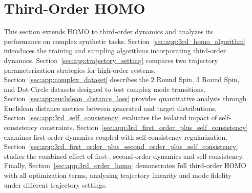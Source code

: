 \section{Third-Order HOMO}\label{sec:app:3rd_homo}
This section extends HOMO to third-order dynamics and analyzes its performance on complex synthetic tasks. Section~\ref{sec:app:3rd_homo_algorithm} introduces the training and sampling algorithms incorporating third-order dynamics. Section~\ref{sec:app:trajectory_setting} compares two trajectory parameterization strategies for high-order systems. Section~\ref{sec:app:complex_dataset} describes the 2 Round Spin, 3 Round Spin, and Dot-Circle datasets designed to test complex mode transitions. Section~\ref{sec:app:euclidean_distance_loss} provides quantitative analysis through Euclidean distance metrics between generated and target distributions. Section~\ref{sec:app:3rd_self_consistency} evaluates the isolated impact of self-consistency constraints. Section~\ref{sec:app:3rd_first_order_plus_self_consistency} examines first-order dynamics coupled with self-consistency regularization. Section~\ref{sec:app:3rd_first_order_plus_second_order_plus_self_consistency} studies the combined effect of first-, second-order dynamics and self-consistency. Finally, Section~\ref{sec:app:3rd_order_homo} demonstrates full third-order HOMO with all optimization terms, analyzing trajectory linearity and mode fidelity under different trajectory settings.
